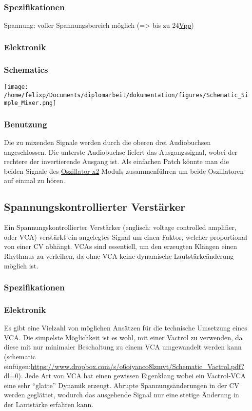 \subsubsection{Spezifikationen}
\label{sec:org781c704}
Spannung: voller Spannungsbereich möglich (=> bis zu 24\href{file:///home/felixp/Documents/diplomarbeit/dokumentation/content/hauptteil.org}{Vpp})
\subsubsection{Elektronik}
\label{sec:orgdf9666d}
\subsubsection{Schematics}
\label{sec:org1d1ab40}
\begin{center}
\texttt{[image: /home/felixp/Documents/diplomarbeit/dokumentation/figures/Schematic\_Simple\_Mixer.png]}
\end{center}
\subsubsection{Benutzung}
\label{sec:orgd9f481e}
Die zu mixenden Signale werden durch die oberen drei Audiobuchsen angeschlossen. Die unterste Audiobuchse liefert das Ausgangssignal, wobei der rechtere der invertierende Ausgang ist. Als einfachen Patch könnte man die beiden Signale des \href{modules/oscillator.org}{Oszillator x2} Moduls zusammenführen um beide Oszillatoren auf einmal zu hören.

\subsection{Spannungskontrollierter Verstärker}
\label{sec:org2074fe5}
Ein Spannungskontrollierter Verstärker (englisch: voltage controlled amplifier, oder VCA) verstärkt ein angelegtes Signal um einen Faktor, welcher proportional von einer \acl{CV} abhängt. \acp{VCA} sind essentiell, um den erzeugten Klängen einen Rhythmus zu verleihen, da ohne \ac{VCA} keine dynamische Lautstärkeänderung möglich ist. 
\subsubsection{Spezifikationen}
\label{sec:org91c06f1}
\subsubsection{Elektronik}
\label{sec:org30b54f5}
Es gibt eine Vielzahl von möglichen Ansätzen für die technische Umsetzung eines \ac{VCA}. Die simpelste Möglichkeit ist es wohl, mit einer Vactrol zu verwenden, da diese mit nur minimaler Beschaltung zu einem VCA umgewandelt werden kann (schematic einfügen:\url{https://www.dropbox.com/s/o6oiyanco8lzmvt/Schematic\_Vactrol.pdf?dl=0}). Jede Art von \ac{VCA} hat einen gewissen Eigenklang wobei ein Vactrol-VCA eine sehr "`glatte"' Dynamik erzeugt. Abrupte Spannungsänderungen in der \acl{CV} werden geglättet, wodurch das ausgehende Signal nur eine stetige Änderung in der Lautstärke erfahren kann.

